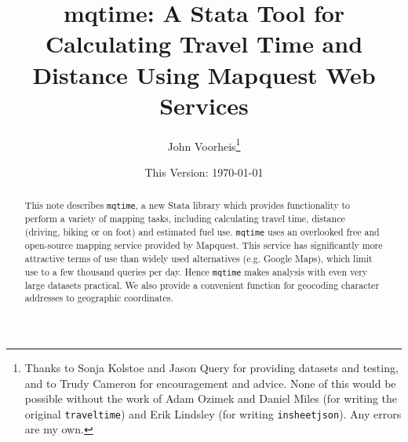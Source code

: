 \documentclass[11pt]{article}
\title{mqtime: A Stata Tool for Calculating Travel Time and Distance Using Mapquest Web Services}
\author{John Voorheis\thanks{Thanks to Sonja Kolstoe and Jason Query for providing datasets and testing, and to Trudy Cameron for encouragement and advice. None of this would be possible without the work of Adam Ozimek and Daniel Miles (for writing the original \texttt{traveltime}) and Erik Lindsley (for writing \texttt{insheetjson}). Any errors are my own.}}
\affil{University of Oregon}
\date{This Version: \today}
\begin{document}
\maketitle

\begin{abstract}
This note describes  \verb|mqtime|, a new Stata library which provides functionality to perform a variety of mapping tasks, including calculating travel time, distance (driving, biking or on foot) and estimated fuel use.  \verb|mqtime| uses an overlooked free and open-source mapping service provided by Mapquest. This service has significantly more attractive terms of use than widely used alternatives (e.g. Google Maps), which limit use to a few thousand queries per day. Hence \verb|mqtime| makes analysis with even very large datasets practical. We also provide a convenient function for geocoding character addresses to geographic coordinates.
\end{abstract}

\newpage
\end{document}
